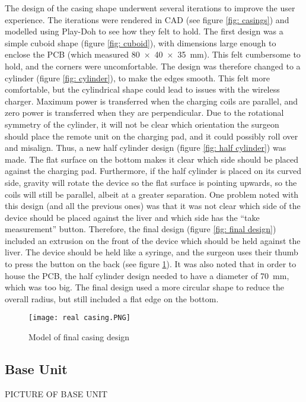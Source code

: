 The design of the casing shape underwent several iterations to improve the user experience. The iterations were rendered in CAD (see figure \ref{fig: casings}) and modelled using Play-Doh to see how they felt to hold. The first design was a simple cuboid shape (figure \ref{fig: cuboid}), with dimensions large enough to enclose the PCB (which measured \SI{80x40x35}{\milli\metre}). This felt cumbersome to hold, and the corners were uncomfortable. The design was therefore changed to a cylinder (figure \ref{fig: cylinder}), to make the edges smooth. This felt more comfortable, but the cylindrical shape could lead to issues with the wireless charger. Maximum power is transferred when the charging coils are parallel, and zero power is transferred when they are perpendicular. Due to the rotational symmetry of the cylinder, it will not be clear which orientation the surgeon should place the remote unit on the charging pad, and it could possibly roll over and misalign. Thus, a new half cylinder design (figure \ref{fig: half cylinder}) was made. The flat surface on the bottom makes it clear which side should be placed against the charging pad. Furthermore, if the half cylinder is placed on its curved side, gravity will rotate the device so the flat surface is pointing upwards, so the coils will still be parallel, albeit at a greater separation. One problem noted with this design (and all the previous ones) was that it was not clear which side of the device should be placed against the liver and which side has the ``take measurement'' button. Therefore, the final design (figure \ref{fig: final design}) included an extrusion on the front of the device which should be held against the liver. The device should be held like a syringe, and the surgeon uses their thumb to press the button on the back (see figure \ref{fig: real casing}). It was also noted that in order to house the PCB, the half cylinder design needed to have a diameter of \SI{70}{\milli\metre}, which was too big. The final design used a more circular shape to reduce the overall radius, but still included a flat edge on the bottom. \\

\begin{figure}[htbp]
	\centering
	\texttt{[image: real casing.PNG]}
	\caption{Model of final casing design}
	\label{fig: real casing}
\end{figure}





\subsection{Base Unit}\label{base casing}
PICTURE OF BASE UNIT\\

